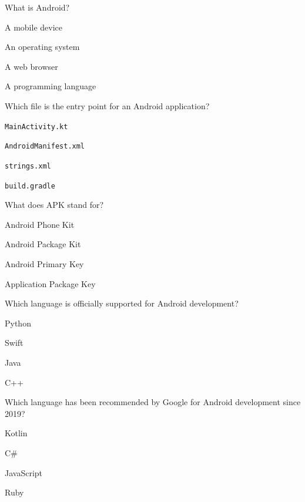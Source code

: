 \documentclass[11pt,a4paper]{article}
\begin{document}
\begin{parts}
  \item What is Android?
    
\begin{parts}
      \item A mobile device
      \item An operating system
      \item A web browser
      \item A programming language
    \end{parts}

  \item Which file is the entry point for an Android application?
    
\begin{parts}
      \item   \texttt{MainActivity.kt}
      \item   \texttt{AndroidManifest.xml}
      \item   \texttt{strings.xml}
      \item   \texttt{build.gradle}
    \end{parts}

  \item What does APK stand for?
    
\begin{parts}
      \item Android Phone Kit
      \item Android Package Kit
      \item Android Primary Key
      \item Application Package Key
    \end{parts}

  \item Which language is officially supported for Android development?
    
\begin{parts}
      \item Python
      \item Swift
      \item Java
      \item C++
    \end{parts}

  \item Which language has been recommended by Google for Android development since 2019?
    
\begin{parts}
      \item Kotlin
      \item C\#
      \item JavaScript
      \item Ruby
    \end{parts}


\end{parts}
\end{document}
